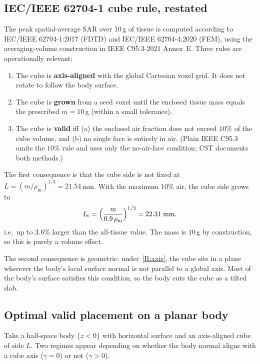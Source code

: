 \documentclass[11pt,a4paper]{article}
\theoremstyle{definition}
\theoremstyle{remark}
\newcommand{\rhom}{\rho_{\mathrm{m}}}
\newcommand{\Lact}{L_{\!*}}
\begin{document}
\subsection{IEC/IEEE 62704-1 cube rule, restated}

The peak spatial-average SAR over 10\,g of tissue is computed
according to IEC/IEEE 62704-1:2017 (FDTD) and IEC/IEEE 62704-4:2020
(FEM), using the averaging-volume construction in IEEE C95.3-2021
Annex~E. Three rules are operationally relevant:

\begin{enumerate}[label=(R\arabic*),leftmargin=2.5em]
  \item\label{R:axis} The cube is \textbf{axis-aligned} with the
    global Cartesian voxel grid. It does not rotate to follow the body
    surface.
  \item\label{R:mass} The cube is \textbf{grown} from a seed voxel
    until the enclosed tissue mass equals the prescribed
    $m=10$\,g (within a small tolerance).
  \item\label{R:air} The cube is \textbf{valid} iff (a) the enclosed
    air fraction does not exceed $10\%$ of the cube volume, and (b)
    no single face is entirely in air. (Plain IEEE C95.3 omits the
    $10\%$ rule and uses only the no-air-face condition; CST
    documents both methods.)
\end{enumerate}

\noindent
The first consequence is that the cube side is not fixed at
$L=(m/\rhom)^{1/3} = 21.54$\,mm. With the maximum 10\% air, the
cube side grows to
\begin{equation}\label{eq:Lact}
  \Lact = \Bigl(\frac{m}{0.9\,\rhom}\Bigr)^{1/3}
  = 22.31\;\mathrm{mm},
\end{equation}
i.e.\ up to $3.6\%$ larger than the all-tissue value. The mass is
$10$\,g by construction, so this is purely a volume effect.

The second consequence is geometric: under~\ref{R:axis}, the cube
sits in a plane wherever the body's local surface normal is not
parallel to a global axis. Most of the body's surface satisfies this
condition, so the body cuts the cube as a tilted slab.

\subsection{Optimal valid placement on a planar body}

Take a half-space body $\{z<0\}$ with horizontal surface and an
axis-aligned cube of side $L$. Two regimes appear depending on
whether the body normal aligns with a cube axis ($\gamma=0$) or not
($\gamma>0$).
\end{document}

